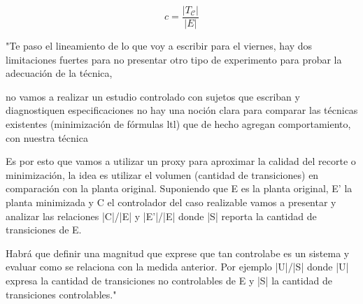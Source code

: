 \[ c = \dfrac{|T_{\mathcal{C}}|}{|E|} \]

\newpage
"Te paso el lineamiento de lo que voy a escribir para el viernes, hay dos limitaciones fuertes para no presentar otro tipo de experimento para probar la adecuación de la técnica,

no vamos a realizar un estudio controlado con sujetos que escriban y diagnostiquen especificaciones
no hay una noción clara para comparar las técnicas existentes (minimización de fórmulas ltl) que de hecho agregan comportamiento, con nuestra técnica


Es por esto que vamos a utilizar un proxy para aproximar la calidad del recorte o minimización, la idea es utilizar el volumen (cantidad de transiciones) en comparación con la planta original. Suponiendo que E es la planta original, E' la planta minimizada y C el controlador del caso realizable vamos a presentar y analizar las relaciones |C|/|E| y |E'|/|E| donde |S| reporta la cantidad de transiciones de E.

Habrá que definir una magnitud que exprese que tan controlabe es un sistema y evaluar como se relaciona con la medida anterior. Por ejemplo |U|/|S| donde |U| expresa la cantidad de transiciones no controlables de E y |S| la cantidad de transiciones controlables."


